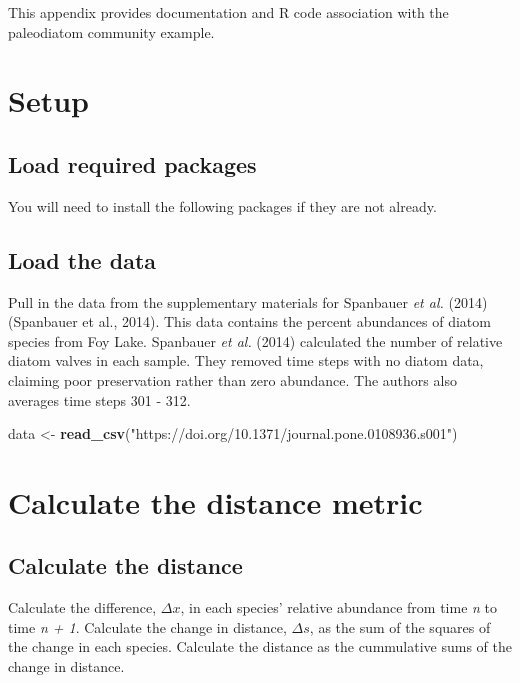 \documentclass[12pt,twoside]{reedthesis}
\newenvironment{Shaded}{\begin{snugshade}}{\end{snugshade}}
\newcommand{\KeywordTok}[1]{\textcolor[rgb]{0.13,0.29,0.53}{\textbf{#1}}}
\newcommand{\StringTok}[1]{\textcolor[rgb]{0.31,0.60,0.02}{#1}}
\newcommand{\NormalTok}[1]{#1}
\begin{document}
This appendix provides documentation and R code association with the
paleodiatom community example.

\section{Setup}\label{setup}

\subsection{Load required packages}\label{load-required-packages}

You will need to install the following packages if they are not already.

\subsection{Load the data}\label{load-the-data}

Pull in the data from the supplementary materials for Spanbauer \emph{et
al.} (2014) (Spanbauer et al., 2014). This data contains the percent
abundances of diatom species from Foy Lake. Spanbauer \emph{et al.}
(2014) calculated the number of relative diatom valves in each sample.
They removed time steps with no diatom data, claiming poor preservation
rather than zero abundance. The authors also averages time steps 301 -
312.
\begin{Shaded}
\begin{Highlighting}[]
\NormalTok{data <-}\StringTok{ }\KeywordTok{read_csv}\NormalTok{(}\StringTok{"https://doi.org/10.1371/journal.pone.0108936.s001"}\NormalTok{)}
\end{Highlighting}
\end{Shaded}
\section{Calculate the distance
metric}\label{calculate-the-distance-metric}

\subsection{Calculate the distance}\label{calculate-the-distance}

Calculate the difference, \(\Delta x\), in each species' relative
abundance from time \emph{n} to time \emph{n + 1}. Calculate the change
in distance, \(\Delta s\), as the sum of the squares of the change in
each species. Calculate the distance as the cummulative sums of the
change in distance.
\end{document}
